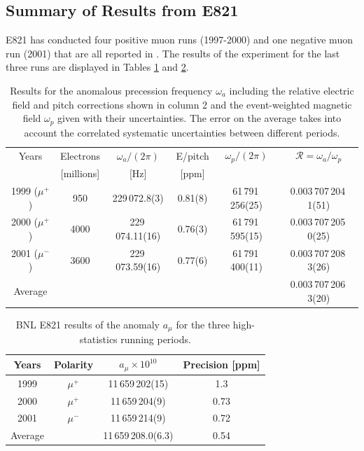 \documentclass{outhesis}
\begin{document}
\subsection{Summary of Results from E821}

E821 has conducted four positive muon runs (1997-2000) and one negative muon run (2001) that are all reported in \cite{bnl}. The results of the experiment for the last three runs are displayed in Tables \ref{tab:R} and \ref{tab:amu}.
\begin{table}
  \caption{Results for the anomalous precession frequency $\omega_a$ including the relative electric field and pitch corrections shown in column 2 and the event-weighted magnetic field $\omega_p$ given with their uncertainties. The error on the average takes into account the correlated systematic uncertainties between different periods.}
  \label{tab:R}
  \centering
  \begin{tabular}{*{6}{c}}
	\hline \hline
      Years  & Electrons & $\omega_a/(2\pi)$& E/pitch & $\omega_p/(2\pi)$ & $\mathcal{R} = \omega_a/\omega_p$\\ 
      &[millions] &  [Hz]  &  [ppm]  & & \\
      \hline
       1999 ($\mu^+$) & 950 & 229\,072.8(3) & 0.81(8) & 61\,791\,256(25)& 0.003\,707\,204\,1(51)  \\
       2000 ($\mu^+$) & 4000 & 229\,074.11(16) & 0.76(3) & 61\,791\,595(15)& 0.003\,707\,205\,0(25)  \\
       2001 ($\mu^-$)  & 3600 & 229\,073.59(16) & 0.77(6) & 61\,791\,400(11)& 0.003\,707\,208\,3(26)  \\  \hline
       Average & & & & & 0.003\,707\,206\,3(20) \\
         \hline  \hline
     \end{tabular}
\end{table}
\begin{table}
  \caption{BNL E821 results of the anomaly $a_{\mu}$ for the three high-statistics running periods. }
  \label{tab:amu}
  \centering
  \begin{tabular}{*{4}{c}}
	\hline \hline
      Years  & Polarity & $a_{\mu}\times 10^{10}$ & Precision [ppm] \\ \hline
       1999 & $\mu^+$ & 11\,659\,202(15) & 1.3  \\
       2000 & $\mu^+$ & 11\,659\,204(9) & 0.73  \\
       2001 & $\mu^-$ & 11\,659\,214(9) & 0.72  \\ \hline
       Average & & 11\,659\,208.0(6.3) & 0.54\\
         \hline  \hline
     \end{tabular}
\end{table}
\end{document}
